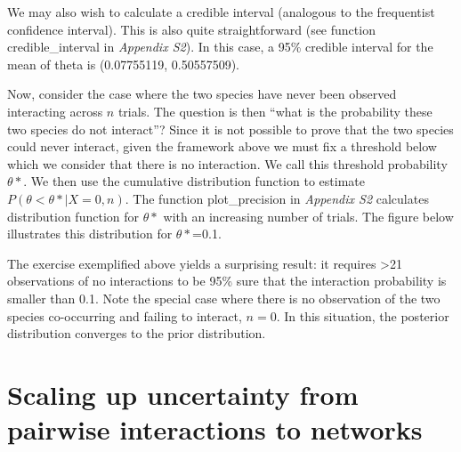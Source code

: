 \documentclass[12pt]{article}
\begin{document}
We may also wish to calculate a credible interval (analogous to the frequentist confidence interval). This is also quite straightforward (see function credible_interval in \emph{Appendix S2}). In this case, a 95\% credible interval for the mean of theta is (0.07755119, 0.50557509).


Now, consider the case where the two species have never been observed interacting across $n$ trials. The question is then ``what is the probability these two species do not interact''? Since it is not possible to prove that the two species could never interact, given the framework above we must fix a threshold below which we consider that there is no interaction. We call this threshold probability $\theta*$. We then use the cumulative distribution function to estimate $P(\theta<\theta*|X=0,n)$. The 
function plot_precision in \emph{Appendix S2} calculates distribution function for $\theta*$ with an increasing number of trials. The figure below illustrates this distribution for $\theta*$=0.1.


The exercise exemplified above yields a surprising result: it requires \textgreater21 observations of no interactions to be 95\% sure that the interaction probability is smaller than 0.1. Note the special case where there is no observation of the two species co-occurring and failing to interact, $n = 0$. In this situation, the posterior distribution converges to the prior distribution. 


\section*{Scaling up uncertainty from pairwise interactions to networks}
\end{document}

